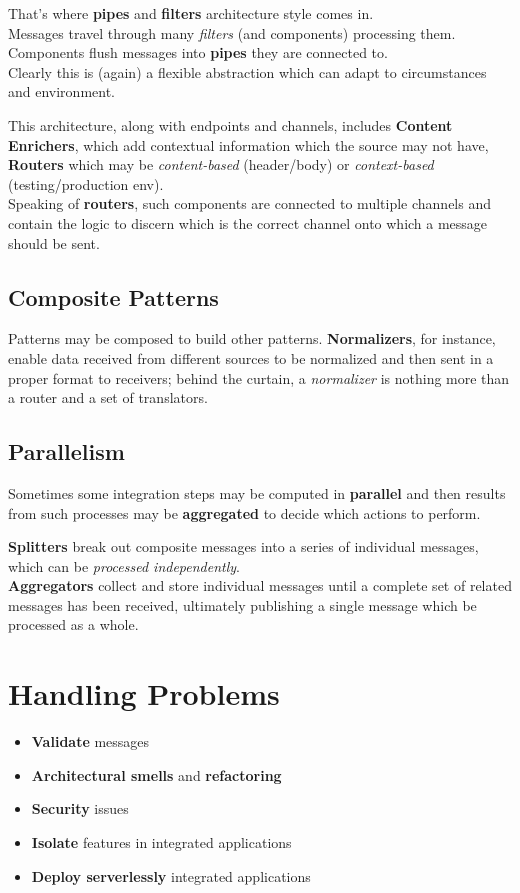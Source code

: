 That's where \textbf{pipes} and \textbf{filters} architecture style comes in.\\
Messages travel through many \textit{filters} (and components) processing them.
Components flush messages into \textbf{pipes} they are connected to.\\
Clearly this is (again) a flexible abstraction which can adapt to circumstances and environment.

This architecture, along with endpoints and channels,
includes \textbf{Content Enrichers}, which add contextual information which the source may not have, \textbf{Routers} which may be \textit{content-based} (header/body) or \textit{context-based} (testing/production env).\\
Speaking of \textbf{routers}, such components are connected to multiple channels and contain the logic to discern which is the correct channel onto which a message should be sent.

\subsection{Composite Patterns}
Patterns may be composed to build other patterns.
\textbf{Normalizers}, for instance, enable data received from different sources to be normalized and then sent in a proper format to receivers;
behind the curtain, a \textit{normalizer} is nothing more than a router and a set of translators.

\subsection{Parallelism}
Sometimes some integration steps may be computed in \textbf{parallel} and then results from such processes may be \textbf{aggregated} to decide which actions to perform.

\textbf{Splitters} break out composite messages into a series of individual messages, which can be \textit{processed independently}.\\
\textbf{Aggregators} collect and store individual messages until a complete set of related messages has been received,
ultimately publishing a single message which be processed as a whole. 


\section{Handling Problems}
\begin{itemize}
   \item \textbf{Validate} messages
   \item \textbf{Architectural smells} and \textbf{refactoring}
   \item \textbf{Security} issues
   \item \textbf{Isolate} features in integrated applications
   \item \textbf{Deploy serverlessly} integrated applications
\end{itemize}